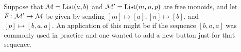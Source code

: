 \documentclass[CT4S-EN-RU]{subfiles}
\begin{document}
\begin{exerciseRUS}
\end{exerciseRUS}


\subsubsection{}

\begin{exampleENG}[Whiskering]\label{ex:whiskering}
Suppose that $\mathcal{M}=\textnormal{List}(a,b)$ and $\mathcal{M}'=\textnormal{List}(m,n,p)$ are free monoids, and let $F\colon\mathcal{M}'\rightarrow\mathcal{M}$ be given by sending $[m]\mapsto[a], [n]\mapsto[b]$, and $[p]\mapsto[b,a,a]$. An application of this might be if the sequence $[b,a,a]$ was commonly used in practice and one wanted to add a new button just for that sequence.


\end{exampleENG}
\end{document}
